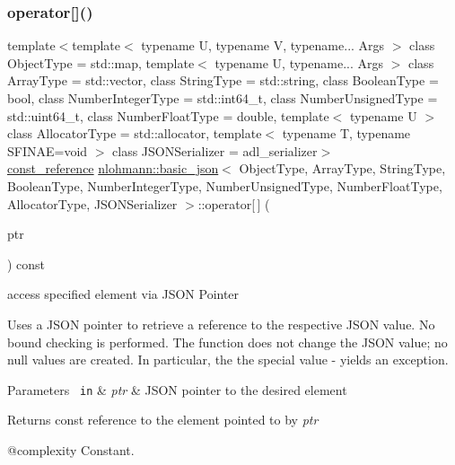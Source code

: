 \subsubsection{\texorpdfstring{operator[]()}{operator[]()}\hspace{0.1cm}{\footnotesize\ttfamily [10/10]}}
{\footnotesize\ttfamily template$<$template$<$ typename U, typename V, typename... Args $>$ class Object\+Type = std\+::map, template$<$ typename U, typename... Args $>$ class Array\+Type = std\+::vector, class String\+Type  = std\+::string, class Boolean\+Type  = bool, class Number\+Integer\+Type  = std\+::int64\+\_\+t, class Number\+Unsigned\+Type  = std\+::uint64\+\_\+t, class Number\+Float\+Type  = double, template$<$ typename U $>$ class Allocator\+Type = std\+::allocator, template$<$ typename T, typename S\+F\+I\+N\+A\+E=void $>$ class J\+S\+O\+N\+Serializer = adl\+\_\+serializer$>$ \\
\mbox{\hyperlink{classnlohmann_1_1basic__json_a4057c5425f4faacfe39a8046871786ca}{const\+\_\+reference}} \mbox{\hyperlink{classnlohmann_1_1basic__json}{nlohmann\+::basic\+\_\+json}}$<$ Object\+Type, Array\+Type, String\+Type, Boolean\+Type, Number\+Integer\+Type, Number\+Unsigned\+Type, Number\+Float\+Type, Allocator\+Type, J\+S\+O\+N\+Serializer $>$\+::operator\mbox{[}$\,$\mbox{]} (\begin{DoxyParamCaption}\item[{const \mbox{\hyperlink{classnlohmann_1_1basic__json_1_1json__pointer}{json\+\_\+pointer}} \&}]{ptr }\end{DoxyParamCaption}) const\hspace{0.3cm}{\ttfamily [inline]}}



access specified element via J\+S\+ON Pointer 

Uses a J\+S\+ON pointer to retrieve a reference to the respective J\+S\+ON value. No bound checking is performed. The function does not change the J\+S\+ON value; no {\ttfamily null} values are created. In particular, the the special value {\ttfamily -\/} yields an exception.


\begin{DoxyParams}[1]{Parameters}
\mbox{\texttt{ in}}  & {\em ptr} & J\+S\+ON pointer to the desired element\\
\hline
\end{DoxyParams}
\begin{DoxyReturn}{Returns}
const reference to the element pointed to by {\itshape ptr} 
\end{DoxyReturn}
@complexity Constant.


